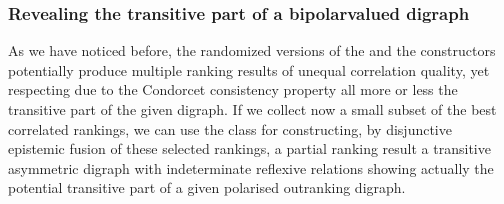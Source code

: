\documentclass[a4paper,12pt,english]{sphinxhowto}
\begin{document}
\subsubsection{Revealing the transitive part of a bipolar\sphinxhyphen{}valued digraph}
\label{\detokenize{pearls:revealing-the-transitive-part-of-a-bipolar-valued-digraph}}
\sphinxAtStartPar
As we have noticed before, the randomized versions of the  and the  constructors potentially produce multiple ranking results of unequal correlation quality, yet respecting \textendash{}due to the Condorcet consistency property\textendash{} all more or less the transitive part of the given digraph. If we collect now a small subset of the best correlated rankings, we can use the  class for constructing, by disjunctive epistemic fusion of these selected rankings, a partial  ranking result \textendash{}a transitive asymmetric digraph with indeterminate reflexive relations\textendash{} showing actually the potential transitive part of a given polarised outranking digraph.
\end{document}
